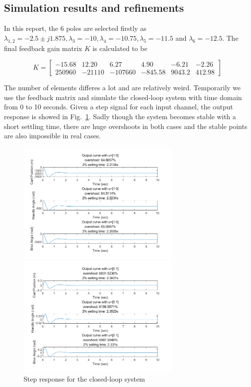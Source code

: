 \documentclass[hyperref]{article}
\theoremstyle{nonumberplain}
\begin{document}
	
	\subsection{Simulation results and refinements}
	
	\hspace{1.0em}
	In this report, the 6 poles are selected firstly as $\lambda_{1,2}=-2.5\pm j1.875, \lambda_{3}=-10, \lambda_{4}=-10.75, \lambda_{5}=-11.5$ and $\lambda_{6}=-12.5$. The final feedback gain matrix $K$ is calculated to be
	
	\begin{equation}
	K=\begin{bmatrix}
	-15.68 &12.20  &6.27  &4.90  &-6.21  &-2.26 \\ 
	250960 &-21110  &-107660  &-845.58  &9043.2  &412.98 
	\end{bmatrix}
	\nonumber
	\end{equation}
	
	The number of elements differes a lot and are relatively weird. Temporarily we use the feedback matrix and simulate the closed-loop system with time domain from 0 to 10 seconds. Given a step signal for each input channel, the output response is showed in Fig.~\ref{fig3}. Sadly though the system becomes stable with a short settling time, there are huge overshoots in both cases and the stable points are also impossible in real cases. 
	
	\begin{figure}[htbp]
		\centering
		\begin{minipage}[t]{0.48\textwidth}
			\centering
			\includegraphics[width=8cm]{fig3.png}
		\end{minipage}
		\begin{minipage}[t]{0.48\textwidth}
			\centering
			\includegraphics[width=8cm]{fig4.png}
		\end{minipage}
	\caption{Step response for the closed-loop system}
	\label{fig3}
	\end{figure}
	
\end{document}
